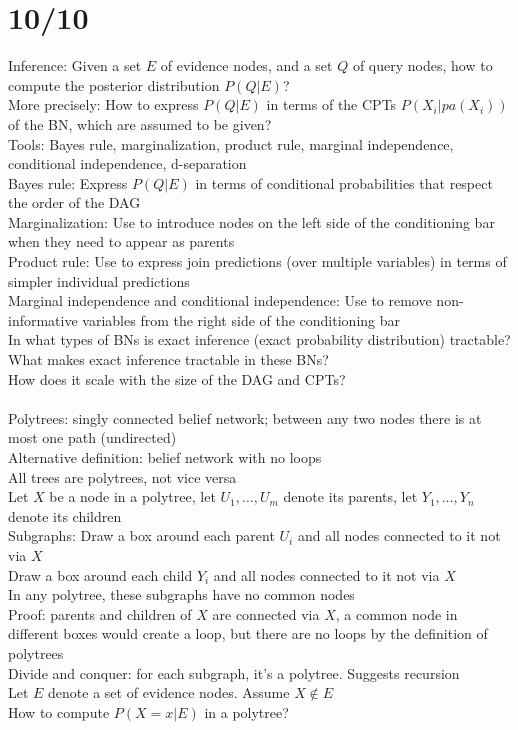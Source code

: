 \documentclass[10pt,letterpaper,unboxed,cm]{article}
\begin{document}
\section{10/10}
Inference: Given a set $E$ of evidence nodes, and a set $Q$ of query nodes, how to compute the posterior distribution $P(Q|E)$?\\
More precisely: How to express $P(Q|E)$ in terms of the CPTs $P(X_i|pa(X_i))$ of the BN, which are assumed to be given?\\
Tools: Bayes rule, marginalization, product rule, marginal independence, conditional independence, d-separation\\
Bayes rule: Express $P(Q|E)$ in terms of conditional probabilities that respect the order of the DAG\\
Marginalization: Use to introduce nodes on the left side of the conditioning bar when they need to appear as parents\\
Product rule: Use to express join predictions (over multiple variables) in terms of simpler individual predictions\\
Marginal independence and conditional independence: Use to remove non-informative variables from the right side of the conditioning bar\\
In what types of BNs is exact inference (exact probability distribution) tractable?\\
What makes exact inference tractable in these BNs?\\
How does it scale with the size of the DAG and CPTs?\\\\
Polytrees: singly connected belief network; between any two nodes there is at most one path (undirected)\\
Alternative definition: belief network with no loops\\
All trees are polytrees, not vice versa\\
Let $X$ be a node in a polytree, let $U_1, \ldots, U_m$ denote its parents, let $Y_1, \ldots, Y_n$ denote its children\\
Subgraphs: Draw a box around each parent $U_i$ and all nodes connected to it not via $X$\\
Draw a box around each child $Y_i$ and all nodes connected to it not via $X$\\
In any polytree, these subgraphs have no common nodes\\
Proof: parents and children of $X$ are connected via $X$, a common node in different boxes would create a loop, but there are no loops by the definition of polytrees\\
Divide and conquer: for each subgraph, it's a polytree. Suggests recursion\\
Let $E$ denote a set of evidence nodes. Assume $X \notin E$\\
How to compute $P(X=x|E)$ in a polytree?\\
\end{document}
